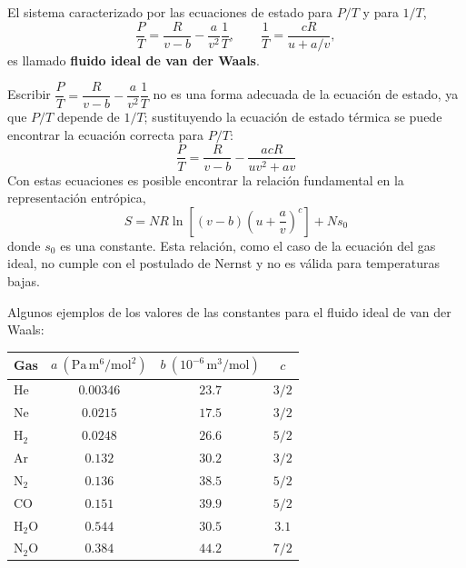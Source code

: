 \begin{definicion}
  El sistema caracterizado por las ecuaciones de estado para $P/T$ y para $1/T$,
  \begin{equation*}
    \frac{P}{T}=\frac{R}{v-b}-\frac{a}{v^{2}}\frac{1}{T},\qquad\frac{1}{T}=\frac{cR}{u+a/v},
  \end{equation*}
  es llamado \textbf{fluido ideal de van der Waals}.
\end{definicion}

Escribir $\dfrac{P}{T}=\dfrac{R}{v-b}-\dfrac{a}{v^{2}}\dfrac{1}{T}$ no es una forma adecuada de la
ecuación de estado, ya que $P/T$ depende de $1/T$; sustituyendo la ecuación de estado térmica se
puede encontrar la ecuación correcta para $P/T$:
\begin{equation*}
  \boxed{\frac{P}{T}=\frac{R}{v-b}-\frac{acR}{uv^{2}+av}}
\end{equation*}
Con estas ecuaciones es posible encontrar la relación fundamental en la representación entrópica,
\begin{equation*}
  \boxed{S=NR\ln\left[(v-b)\left(u+\frac{a}{v}\right)^{c}\right]+Ns_0}
\end{equation*}
donde $s_0$ es una constante. Esta relación, como el caso de la ecuación del gas ideal, no cumple
con el postulado de Nernst y no es válida para temperaturas bajas.

Algunos ejemplos de los valores de las constantes para el fluido ideal de van der Waals:
\begin{center}
  \begin{tabular}{lccc}
    \hline
    Gas & $a\ \left(\mathrm{Pa\,m^{6}/mol^{2}}\right)$ & $b\ \left(10^{-6}\,\mathrm{m^{3}/mol}\right)$ & $c$\\
    \hline
    He & $0.00346$ & $23.7$ & $3/2$\\
    Ne & $0.0215$ & $17.5$ & $3/2$\\
    $\mathrm{H_2}$ & $0.0248$ & $26.6$ & $5/2$\\
    Ar & $0.132$ & $30.2$ & $3/2$\\
    $\mathrm{N_2}$ & $0.136$ & $38.5$ & $5/2$\\
    CO & $0.151$ & $39.9$ & $5/2$\\
    $\mathrm{H_2O}$ & $0.544$ & $30.5$ & $3.1$\\
    $\mathrm{N_2O}$ & $0.384$ & $44.2$ & $7/2$\\
    \hline
  \end{tabular}
\end{center}

